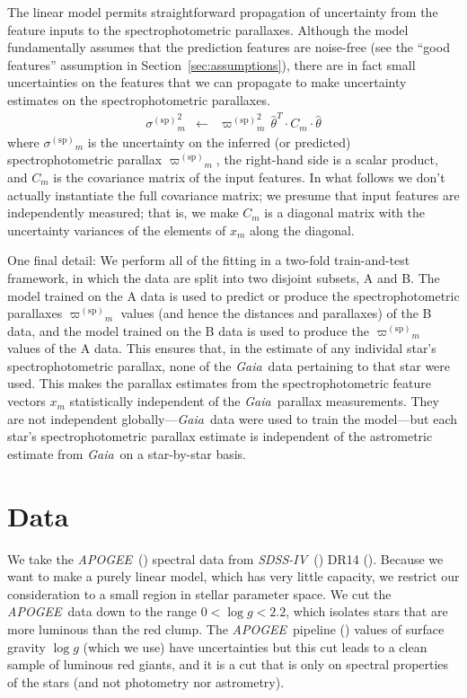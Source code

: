 \documentclass[modern]{aastex62}
\newcommand{\sectionname}{Section}
\newcommand{\acronym}[1]{{\small{#1}}}
\newcommand{\project}[1]{\textsl{#1}}
\newcommand{\apogee}{\project{\acronym{APOGEE}}}
\newcommand{\gaia}{\project{Gaia}}
\newcommand{\sdssiv}{\project{\acronym{SDSS-IV}}}
\newcommand{\logg}{\log g}
\newcommand{\sparallax}{{\varpi^{(\mathrm{sp})}}}
\newcommand{\ssigma}{{\sigma^{(\mathrm{sp})}}}
\begin{document}
The linear model permits straightforward propagation of uncertainty from the
feature inputs to the spectrophotometric parallaxes.
Although the model fundamentally assumes that the prediction features are noise-free
(see the ``good features'' assumption in \sectionname~\ref{sec:assumptions}),
there are in fact small uncertainties on the features that we can propagate to 
make uncertainty estimates on the spectrophotometric parallaxes.
\begin{eqnarray}
\ssigma_m^2 &\leftarrow& \sparallax_m^2\,\hat{\theta}^T\cdot C_m\cdot\hat{\theta}
\label{eq:unc}
\end{eqnarray}
where $\ssigma_m$ is the uncertainty on the inferred (or predicted)
spectrophotometric parallax $\sparallax_m$,
the right-hand side is a scalar product,
and $C_m$ is the covariance matrix of the input
features.
In what follows we don't actually instantiate the full covariance matrix; we presume
that input features are independently measured;
that is, we make $C_m$ is a diagonal matrix with the uncertainty variances of the elements
of $x_m$ along the diagonal.

One final detail: We perform all of the fitting in a two-fold train-and-test framework,
in which the data are split into two disjoint subsets, A and B.
The model trained on the A data is used to predict or produce
the spectrophotometric parallaxes $\sparallax_m$ values (and hence
the distances and parallaxes) of the B data,
and the model trained on the B data is used to 
produce the $\sparallax_m$ values of the A data.
This ensures that, in the estimate of any individal star's
spectrophotometric parallax, none of the \gaia\ data pertaining to that star were used.
This makes the parallax estimates from the spectrophotometric feature vectors
$x_m$ statistically independent of the \gaia\ parallax measurements.
They are not independent globally---\gaia\ data were used to train the model---but
each star's spectrophotometric parallax estimate is independent
of the astrometric estimate from \gaia\ on a star-by-star basis.

\section{Data}

We take the \apogee\ (\citealt{aapogee, wapogee, apogee}) spectral data
from \sdssiv\ (\citealt{sdssiv}) \acronym{DR14} (\citealt{dr14}).
Because we want to make a purely linear model, which has very little capacity,
we restrict our consideration to a small region in stellar parameter space.
We cut the \apogee\ data down to the range $0<\logg<2.2$, which isolates
stars that are more luminous than the red clump.
The \apogee\ pipeline (\citealt{aspcap})
values of surface gravity $\logg$ (which we use) have uncertainties but
this cut leads to a clean sample of luminous red giants, and it is a cut
that is only on spectral properties of the stars (and not photometry nor astrometry).
\end{document}
